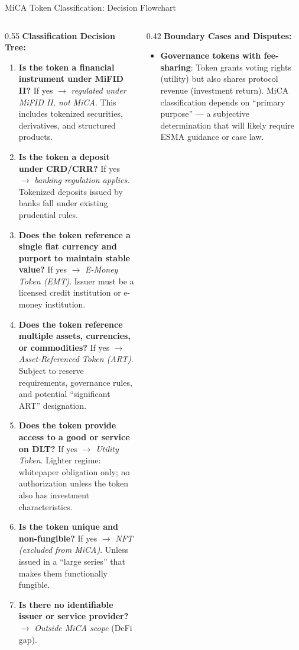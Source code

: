 
\begin{frame}{MiCA Token Classification: Decision Flowchart}
  \begin{columns}[T]
    \begin{column}{0.55\textwidth}
      \textbf{Classification Decision Tree:}
      \vspace{0.3em}
      \begin{enumerate}
        \item \textbf{Is the token a financial instrument under MiFID II?} If yes $\to$ \textit{regulated under MiFID II, not MiCA}. This includes tokenized securities, derivatives, and structured products.
        \item \textbf{Is the token a deposit under CRD/CRR?} If yes $\to$ \textit{banking regulation applies}. Tokenized deposits issued by banks fall under existing prudential rules.
        \item \textbf{Does the token reference a single fiat currency and purport to maintain stable value?} If yes $\to$ \textit{E-Money Token (EMT)}. Issuer must be a licensed credit institution or e-money institution.
        \item \textbf{Does the token reference multiple assets, currencies, or commodities?} If yes $\to$ \textit{Asset-Referenced Token (ART)}. Subject to reserve requirements, governance rules, and potential ``significant ART'' designation.
        \item \textbf{Does the token provide access to a good or service on DLT?} If yes $\to$ \textit{Utility Token}. Lighter regime: whitepaper obligation only; no authorization unless the token also has investment characteristics.
        \item \textbf{Is the token unique and non-fungible?} If yes $\to$ \textit{NFT (excluded from MiCA)}. Unless issued in a ``large series'' that makes them functionally fungible.
        \item \textbf{Is there no identifiable issuer or service provider?} $\to$ \textit{Outside MiCA scope} (DeFi gap).
      \end{enumerate}
    \end{column}
    \begin{column}{0.42\textwidth}
      \textbf{Boundary Cases and Disputes:}
      \begin{itemize}
        \item \textbf{Governance tokens with fee-sharing}: Token grants voting rights (utility) but also shares protocol revenue (investment return). MiCA classification depends on ``primary purpose'' --- a subjective determination that will likely require ESMA guidance or case law.

\end{itemize}
\end{column}
\end{columns}
\end{frame}

